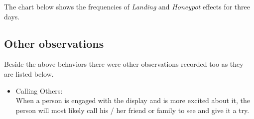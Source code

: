 The chart below shows the frequencies of \emph{Landing} and \emph{Honeypot} effects for three days. 



\begin{table}[H]
\centering
\label{tab:landingandhonypot}
\end{table}



\subsection{Other observations}
Beside the above behaviors there were other observations recorded too as they are listed below. 
\begin{itemize}

\item Calling Others: \\
When a person is engaged with the display and is more excited about it, the person will most likely call his / her friend or family to see and give it a try. 
\end{itemize}

